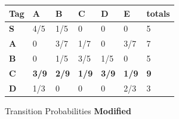 \documentclass[12pt]{article}
\begin{document}
\begin{enumerate}
\begin{enumerate}
\begin{description}
                          \begin{figure}[h]
                              \centering
                              \begin{tabular}{|l|l|l|l|l|l|l|}
                                  \hline
                                  \textbf{Tag} & A            & B            & C            & D            & E            & totals     \\
                                  \hline
                                  \textbf{S}   & 4/5          & 1/5          & 0            & 0            & 0            & 5          \\
                                  \textbf{A}   & 0            & 3/7          & 1/7          & 0            & 3/7          & 7          \\
                                  \textbf{B}   & 0            & 1/5          & 3/5          & 1/5          & 0            & 5          \\
                                  \textbf{C}   & \textbf{3/9} & \textbf{2/9} & \textbf{1/9} & \textbf{3/9} & \textbf{1/9} & \textbf{9} \\
                                  \textbf{D}   & 1/3          & 0            & 0            & 0            & 2/3          & 3          \\
                                  \hline
                              \end{tabular}
                              \caption{Transition Probabilities \textbf{Modified}}
                          \end{figure}


\end{description}
\end{enumerate}
\end{enumerate}
\end{document}
